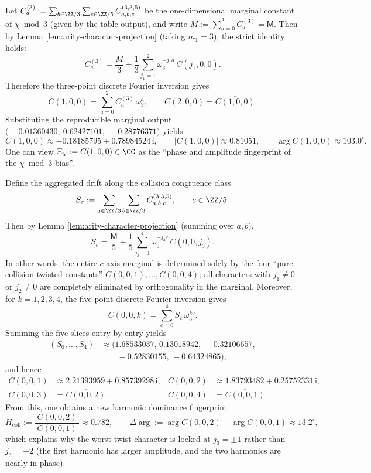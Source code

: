 \begin{corollary}\label{cor:arity-335-marginal-invert-chi}
Let \(C^{(3)}_a:=\sum_{b\in\ZZ/3}\sum_{c\in\ZZ/5}C^{(3,3,5)}_{a,b,c}\) be the one-dimensional marginal constant of \(\chi\bmod 3\) (given by the table output), and write \(M:=\sum_{a=0}^2 C^{(3)}_a=\mathsf{M}\).
Then by Lemma \ref{lem:arity-character-projection} (taking \(m_1=3\)), the strict identity holds:
\[
C^{(3)}_a=\frac{M}{3}+\frac13\sum_{j_1=1}^{2}\omega_3^{-j_1a}\,C(j_1,0,0).
\]
Therefore the three-point discrete Fourier inversion gives
\[
C(1,0,0)=\sum_{a=0}^{2}C^{(3)}_a\,\omega_3^{a},\qquad
C(2,0,0)=\overline{C(1,0,0)}.
\]
Substituting the reproducible marginal output \(\bigl(-0.01360430,\ 0.62427101,\ -0.28776371\bigr)\) yields
\[
C(1,0,0)\approx -0.18185795+0.78984524\,\mathrm{i},
\qquad
|C(1,0,0)|\approx 0.81051,
\qquad
\arg C(1,0,0)\approx 103.0^\circ.
\]
One can view \(\Xi_\chi:=C(1,0,0)\in\CC\) as the ``phase and amplitude fingerprint of the \(\chi\bmod 3\) bias''.
\end{corollary}

\begin{corollary}\label{cor:arity-335-marginal-invert-collision}
Define the aggregated drift along the collision congruence class
\[
S_c:=\sum_{a\in\ZZ/3}\sum_{b\in\ZZ/3}C^{(3,3,5)}_{a,b,c},
\qquad c\in\ZZ/5.
\]
Then by Lemma \ref{lem:arity-character-projection} (summing over \(a,b\)),
\[
S_c=\frac{\mathsf{M}}{5}+\frac15\sum_{j_3=1}^{4}\omega_5^{-j_3c}\,C(0,0,j_3).
\]
In other words: the entire \(c\)-axis marginal is determined solely by the four ``pure collision twisted constants'' \(C(0,0,1),\dots,C(0,0,4)\); all characters with \(j_1\ne0\) or \(j_2\ne0\) are completely eliminated by orthogonality in the marginal.
Moreover, for \(k=1,2,3,4\), the five-point discrete Fourier inversion gives
\[
C(0,0,k)=\sum_{c=0}^{4}S_c\,\omega_5^{kc}.
\]
Summing the five slices entry by entry yields
\[
\begin{aligned}
(S_0,\dots,S_4)
&\approx(1.68533037,\,0.13018942,\,-0.32106657,\\
&\qquad -0.52830155,\,-0.64324865),
\end{aligned}
\]
and hence
\[
\begin{aligned}
C(0,0,1)&\approx 2.21393959+0.85739298\,\mathrm{i},&
C(0,0,2)&\approx 1.83793482+0.25752331\,\mathrm{i},\\
C(0,0,3)&=\overline{C(0,0,2)},&
C(0,0,4)&=\overline{C(0,0,1)}.
\end{aligned}
\]
From this, one obtains a new harmonic dominance fingerprint
\[
H_{\mathrm{coll}}:=\frac{|C(0,0,2)|}{|C(0,0,1)|}\approx 0.782,
\qquad
\Delta\arg:=\arg C(0,0,2)-\arg C(0,0,1)\approx 13.2^\circ,
\]
which explains why the worst-twist character is locked at \(j_3=\pm1\) rather than \(j_3=\pm2\) (the first harmonic has larger amplitude, and the two harmonics are nearly in phase).
\end{corollary}

